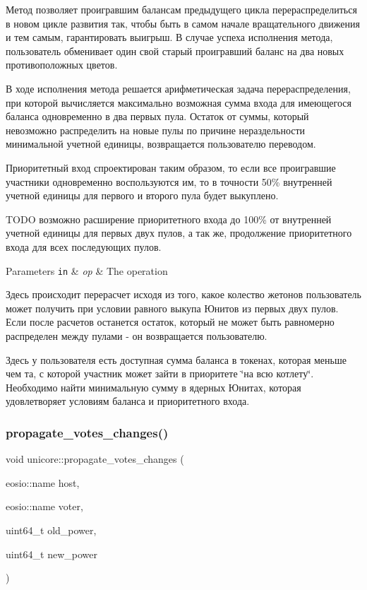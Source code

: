 Метод позволяет проигравшим балансам предыдущего цикла перераспределиться в новом цикле развития так, чтобы быть в самом начале вращательного движения и тем самым, гарантировать выигрыш. В случае успеха исполнения метода, пользователь обменивает один свой старый проигравший баланс на два новых противоположных цветов.

В ходе исполнения метода решается арифметическая задача перераспределения, при которой вычисляется максимально возможная сумма входа для имеющегося баланса одновременно в два первых пула. Остаток от суммы, который невозможно распределить на новые пулы по причине нераздельности минимальной учетной единицы, возвращается пользователю переводом.

Приоритетный вход спроектирован таким образом, то если все проигравшие участники одновременно воспользуются им, то в точности 50\% внутренней учетной единицы для первого и второго пула будет выкуплено.

T\+O\+DO возможно расширение приоритетного входа до 100\% от внутренней учетной единицы для первых двух пулов, а так же, продолжение приоритетного входа для всех последующих пулов.


\begin{DoxyParams}[1]{Parameters}
\mbox{\tt in}  & {\em op} & The operation \\
\hline
\end{DoxyParams}
Здесь происходит перерасчет исходя из того, какое колество жетонов пользователь может получить при условии равного выкупа Юнитов из первых двух пулов. Если после расчетов останется остаток, который не может быть равномерно распределен между пулами -\/ он возвращается пользователю.

Здесь у пользователя есть доступная сумма баланса в токенах, которая меньше чем та, с которой участник может зайти в приоритете \char`\"{}на всю котлету\char`\"{}. Необходимо найти минимальную сумму в ядерных Юнитах, которая удовлетворяет условиям баланса и приоритетного входа.\mbox{\label{classunicore_a9db4a730ab5cb5c91f4af22fcbe314fc}} 
\subsubsection{\texorpdfstring{propagate\+\_\+votes\+\_\+changes()}{propagate\_votes\_changes()}}
{\footnotesize\ttfamily void unicore\+::propagate\+\_\+votes\+\_\+changes (\begin{DoxyParamCaption}\item[{eosio\+::name}]{host,  }\item[{eosio\+::name}]{voter,  }\item[{uint64\+\_\+t}]{old\+\_\+power,  }\item[{uint64\+\_\+t}]{new\+\_\+power }\end{DoxyParamCaption})\hspace{0.3cm}{\ttfamily [static]}}




